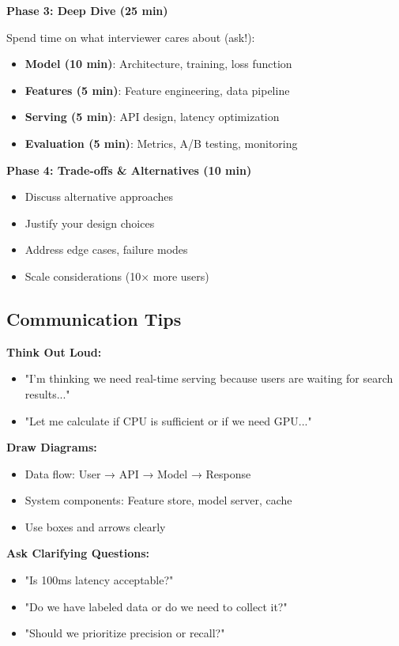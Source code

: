 \documentclass[10pt]{article}
\begin{document}
\textbf{Phase 3: Deep Dive (25 min)}

Spend time on what interviewer cares about (ask!):
\begin{itemize}
\item \textbf{Model (10 min)}: Architecture, training, loss function
\item \textbf{Features (5 min)}: Feature engineering, data pipeline
\item \textbf{Serving (5 min)}: API design, latency optimization
\item \textbf{Evaluation (5 min)}: Metrics, A/B testing, monitoring
\end{itemize}

\textbf{Phase 4: Trade-offs \& Alternatives (10 min)}
\begin{itemize}
\item Discuss alternative approaches
\item Justify your design choices
\item Address edge cases, failure modes
\item Scale considerations (10× more users)
\end{itemize}

\subsection{Communication Tips}

\textbf{Think Out Loud:}
\begin{itemize}
\item "I'm thinking we need real-time serving because users are waiting for search results..."
\item "Let me calculate if CPU is sufficient or if we need GPU..."
\end{itemize}

\textbf{Draw Diagrams:}
\begin{itemize}
\item Data flow: User → API → Model → Response
\item System components: Feature store, model server, cache
\item Use boxes and arrows clearly
\end{itemize}

\textbf{Ask Clarifying Questions:}
\begin{itemize}
\item "Is 100ms latency acceptable?"
\item "Do we have labeled data or do we need to collect it?"
\item "Should we prioritize precision or recall?"
\end{itemize}
\end{document}
